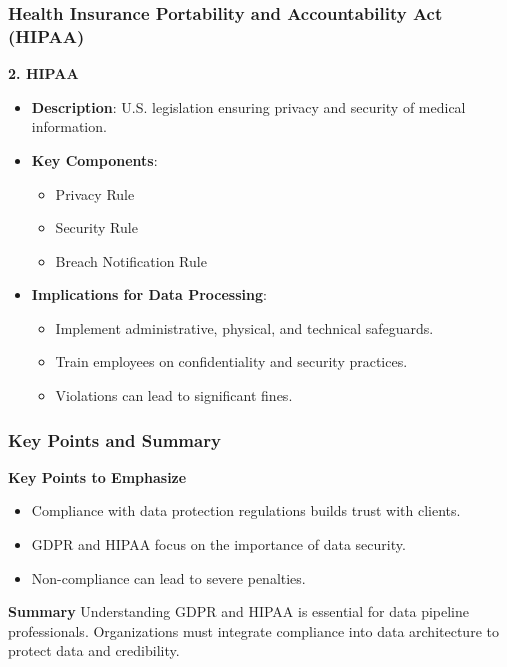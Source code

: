 \documentclass{beamer}
\begin{document}
\begin{frame}[fragile]
    \frametitle{Health Insurance Portability and Accountability Act (HIPAA)}

    \textbf{2. HIPAA}  
    \begin{itemize}
        \item \textbf{Description}: U.S. legislation ensuring privacy and security of medical information.
        \item \textbf{Key Components}:
        \begin{itemize}
            \item Privacy Rule
            \item Security Rule
            \item Breach Notification Rule
        \end{itemize}
        \item \textbf{Implications for Data Processing}:
        \begin{itemize}
            \item Implement administrative, physical, and technical safeguards.
            \item Train employees on confidentiality and security practices.
            \item Violations can lead to significant fines.
        \end{itemize}
    \end{itemize}
\end{frame}

\begin{frame}[fragile]
    \frametitle{Key Points and Summary}

    \textbf{Key Points to Emphasize}
    \begin{itemize}
        \item Compliance with data protection regulations builds trust with clients.
        \item GDPR and HIPAA focus on the importance of data security.
        \item Non-compliance can lead to severe penalties.
    \end{itemize}

    \textbf{Summary}  
    Understanding GDPR and HIPAA is essential for data pipeline professionals. Organizations must integrate compliance into data architecture to protect data and credibility.
\end{frame}
\end{document}
